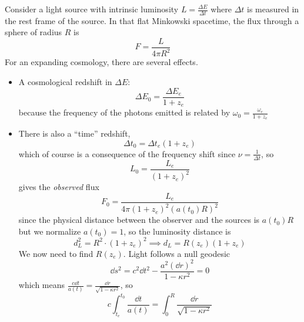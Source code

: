 \documentclass[a4paper,twoside,master.tex]{subfiles}
\begin{document}

Consider a light source with intrinsic luminosity $ L = \frac{\Delta E}{\Delta t} $ where $ \Delta t $ is measured in the rest frame of the source. In that flat Minkowski spacetime, the flux through a sphere of radius $ R $ is
\begin{equation}
    F = \frac{L}{4 \pi R^2}
\end{equation}
For an expanding cosmology, there are several effects.
\begin{itemize}
    \item A cosmological redshift in $ \Delta E $:
        \begin{equation}
            \Delta E_0 = \frac{\Delta E_e}{1 + z_e}
        \end{equation}
        because the frequency of the photons emitted is related by $ \omega_0 = \frac{\omega_e}{1 + z_e} $ 
    \item There is also a ``time'' redshift,
        \begin{equation}
            \Delta t_0 = \Delta t_e (1 + z_e)
        \end{equation}
        which of course is a consequence of the frequency shift since $ \nu = \frac{1}{\Delta t} $, so
        \begin{equation}
            L_0 = \frac{L_e}{(1 + z_e)^2}
        \end{equation}
        gives the \textit{observed} flux
        \begin{equation}
            F_0 = \frac{L_e}{4 \pi (1 + z_e)^2 (a(t_0) R)^2}
        \end{equation}
        since the physical distance between the observer and the sources is $ a(t_0 )R $ but we normalize $ a(t_0) = 1 $, so the luminosity distance is
        \begin{equation}
            d^2_L = R^2 \cdot (1 + z_e)^2 \implies d_L = R(z_e) (1 + z_e)
        \end{equation}
        We now need to find $ R(z_e) $. Light follows a null geodesic
        \begin{equation}
            \dd{s}^2 = c^2 \dd{t}^2 - \frac{a^2 (\dd{r})^2}{1 - \kappa r^2} = 0
        \end{equation}
        which means $ \frac{c \dd{t}}{a(t)} = \frac{\dd{r}}{\sqrt{1 - \kappa r^2}} $, so
        \begin{equation}
            c \int_{t_e}^{t_0} \frac{\dd{t}}{a(t)} = \int_0^R \frac{\dd{r}}{\sqrt{1 - \kappa r^2}}

\end{equation}
\end{itemize}
\end{document}
